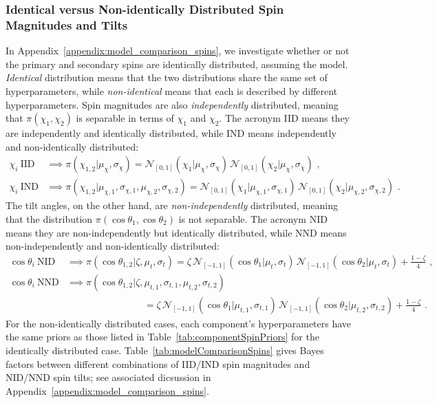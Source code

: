 \subsubsection{Identical versus Non-identically Distributed Spin Magnitudes and Tilts}
\label{appendix:iid}

In Appendix~\ref{appendix:model_comparison_spins}, we investigate whether or not the primary and secondary spins are identically distributed, assuming the  model.
\textit{Identical} distribution means that the two distributions share the same set of hyperparameters, while \textit{non-identical}  means that each is described by different hyperparameters.
Spin magnitudes are also \textit{independently} distributed, meaning that $\pi(\chi_1, \chi_2)$ is separable in terms of $\chi_1$ and $\chi_2$.
The acronym IID means they are independently and identically distributed, while IND means independently and non-identically distributed:
%
\begin{align}
	\chi_i~\mathrm{IID} & \implies \pi(\chi_{1,2} | \mu_\chi, \sigma_\chi) = \mathcal{N}_{[0,1]}(\chi_1 | \mu_\chi, \sigma_\chi) \, \mathcal{N}_{[0,1]}( \chi_2 | \mu_\chi, \sigma_\chi) \,\, , \label{eqn:iid_mags} \\
	\chi_i~\mathrm{IND} & \implies \pi(\chi_{1,2} | \mu_{\chi,1}, \sigma_{\chi,1}, \mu_{\chi,2}, \sigma_{\chi,2}) = \mathcal{N}_{[0,1]}(\chi_1 | \mu_{\chi,1}, \sigma_{\chi,1}) \, \mathcal{N}_{[0,1]}( \chi_2 | \mu_{\chi,2}, \sigma_{\chi,2}) \,\,.
	\label{eqn:ind_mags}
\end{align}
%
The tilt angles, on the other hand, are \textit{non-independently} distributed, meaning that the distribution $\pi(\cos\theta_1, \cos\theta_2)$ is not separable.
The acronym NID means they are non-independently but identically distributed, while NND means non-independently and non-identically distributed:
%
\begin{align}
	\cos\theta_i~\mathrm{NID} & \implies \pi(\cos\theta_{1,2}|\zeta, \mu_t, \sigma_t) = \zeta \,\mathcal{N}_{[-1,1]}(\cos\theta_1 | \mu_t, \sigma_t)\,\mathcal{N}_{[-1,1]}(\cos\theta_2 | \mu_t, \sigma_t) + \frac{1-\zeta}{4} \label{eqn:nid_tilts} \,\, ,\\
	\cos\theta_i~\mathrm{NND} & \implies \pi(\cos\theta_{1,2}|\zeta, \mu_{t,1}, \sigma_{t,1}, \mu_{t,2}, \sigma_{t,2}) \\ & \qquad\qquad\qquad\qquad = \zeta \,\mathcal{N}_{[-1,1]}(\cos\theta_1 | \mu_{t,1}, \sigma_{t,1})\,\mathcal{N}_{[-1,1]}(\cos\theta_2 | \mu_{t,2}, \sigma_{t,2})  + \frac{1-\zeta}{4} \,\,.
	\label{eqn:nnd_tilts}
\end{align}
%
For the non-identically distributed cases, each component's hyperparameters have the same priors as those listed in Table~\ref{tab:componentSpinPriors} for the identically distributed case. 
Table~\ref{tab:modelComparisonSpins} gives Bayes factors between different combinations of IID/IND spin magnitudes and NID/NND spin tilts; see associated dicsussion in Appendix~\ref{appendix:model_comparison_spins}.

